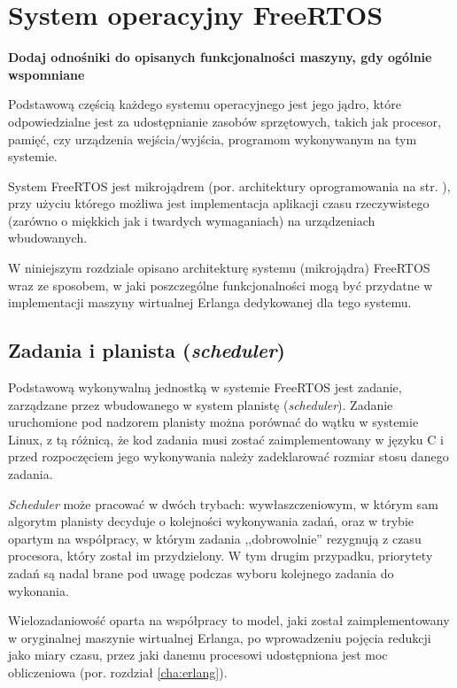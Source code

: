 \chapter{System operacyjny FreeRTOS}
\label{cha:freertos}

\textbf{Dodaj odnośniki do opisanych funkcjonalności maszyny, gdy ogólnie wspomniane}

Podstawową częścią każdego systemu operacyjnego jest jego jądro, które odpowiedzialne jest za udostępnianie zasobów sprzętowych, takich jak procesor, pamięć, czy urządzenia wejścia/wyjścia, programom wykonywanym na tym systemie.

System FreeRTOS jest mikrojądrem (por. architektury oprogramowania na str. \pageref{ref:architektury}), przy użyciu którego możliwa jest implementacja aplikacji czasu rzeczywistego (zarówno o miękkich jak i twardych wymaganiach) na urządzeniach wbudowanych.

W niniejszym rozdziale opisano architekturę systemu (mikrojądra) FreeRTOS wraz ze sposobem, w jaki
poszczególne funkcjonalności mogą być przydatne w implementacji maszyny wirtualnej Erlanga dedykowanej dla tego systemu.

\section{Zadania i planista (\emph{scheduler})}
\label{sec:rtosScheduler}

Podstawową wykonywalną jednostką w systemie FreeRTOS jest zadanie, zarządzane przez wbudowanego w system planistę (\emph{scheduler}).
Zadanie uruchomione pod nadzorem planisty można porównać do wątku w systemie Linux, z tą różnicą, że kod zadania musi zostać zaimplementowany w języku C i przed rozpoczęciem jego wykonywania należy zadeklarować rozmiar stosu danego zadania.

\emph{Scheduler} może pracować w dwóch trybach: wywłaszczeniowym, w którym sam algorytm planisty decyduje o kolejności wykonywania zadań, oraz w trybie opartym na współpracy, w którym zadania ,,dobrowolnie'' rezygnują z czasu procesora, który został im przydzielony. W tym drugim przypadku, priorytety zadań są nadal brane pod uwagę podczas wyboru kolejnego zadania do wykonania.

Wielozadaniowość oparta na współpracy to model, jaki został zaimplementowany w oryginalnej maszynie wirtualnej Erlanga, po wprowadzeniu pojęcia redukcji jako miary czasu, przez jaki danemu procesowi udostępniona jest moc obliczeniowa (por. rozdział \ref{cha:erlang}).

